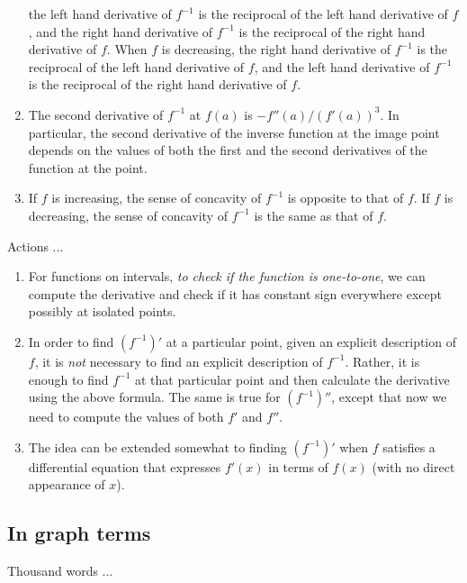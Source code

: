 \documentclass[10pt]{amsart}
\begin{document}
\begin{enumerate}
  the left hand derivative of $f^{-1}$ is the reciprocal of the left
  hand derivative of $f$, and the right hand derivative of $f^{-1}$ is
  the reciprocal of the right hand derivative of $f$. When $f$ is
  decreasing, the right hand derivative of $f^{-1}$ is the reciprocal
  of the left hand derivative of $f$, and the left hand derivative of
  $f^{-1}$ is the reciprocal of the right hand derivative of $f$.
\item The second derivative of $f^{-1}$ at $f(a)$ is
  $-f''(a)/(f'(a))^3$. In particular, the second derivative of the
  inverse function at the image point depends on the values of both
  the first and the second derivatives of the function at the point.
\item If $f$ is increasing, the sense of concavity of $f^{-1}$ is
  opposite to that of $f$. If $f$ is decreasing, the sense of
  concavity of $f^{-1}$ is the same as that of $f$.
\end{enumerate}

Actions ...

\begin{enumerate}
\item For functions on intervals, {\em to check if the function
  is one-to-one}, we can compute the derivative and check if it has
  constant sign everywhere except possibly at isolated points.
\item In order to find $(f^{-1})'$ at a particular point, given an
  explicit description of $f$, it is {\em not} necessary to find an
  explicit description of $f^{-1}$. Rather, it is enough to find
  $f^{-1}$ at that particular point and then calculate the derivative
  using the above formula. The same is true for $(f^{-1})''$, except
  that now we need to compute the values of both $f'$ and $f''$.
\item The idea can be extended somewhat to finding $(f^{-1})'$ when $f$
  satisfies a differential equation that expresses $f'(x)$ in terms of
  $f(x)$ (with no direct appearance of $x$).
\end{enumerate}
\subsection{In graph terms}

Thousand words ...
\end{document}
